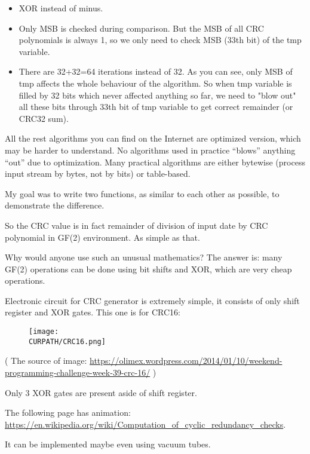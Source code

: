 \begin{itemize}
\item XOR instead of minus.

\item Only \ac{MSB} is checked during comparison. But the \ac{MSB} of all CRC polynomials is always 1,
so we only need to check \ac{MSB} (33th bit) of the tmp variable.

\item There are 32+32=64 iterations instead of 32.
As you can see, only \ac{MSB} of tmp affects the whole behaviour of the algorithm.
So when tmp variable is filled by 32 bits which never affected anything so far,
we need to "blow out" all these bits through 33th bit of tmp variable to get correct remainder (or CRC32 sum).
\end{itemize}

All the rest algorithms you can find on the Internet are optimized version, which may be harder to understand.
No algorithms used in practice ``blows'' anything ``out'' due to optimization.
Many practical algorithms are either bytewise (process input stream by bytes, not by bits) or table-based.

My goal was to write two functions, as similar to each other as possible, to demonstrate the difference.

So the CRC value is in fact remainder of division of input date by CRC polynomial in GF(2) environment.
As simple as that.


Why would anyone use such an unusual mathematics?
The answer is: many GF(2) operations can be done using bit shifts and XOR, which are very cheap operations.

Electronic circuit for CRC generator is extremely simple, it consists of only shift register and XOR gates.
This one is for CRC16:

\begin{figure}[H]
\centering
\texttt{[image: \\CURPATH/CRC16.png]}
\caption{}
\end{figure}

( The source of image: \url{https://olimex.wordpress.com/2014/01/10/weekend-programming-challenge-week-39-crc-16/} )

Only 3 XOR gates are present aside of shift register.

The following page has animation: \url{https://en.wikipedia.org/wiki/Computation_of_cyclic_redundancy_checks}.

It can be implemented maybe even using vacuum tubes.

